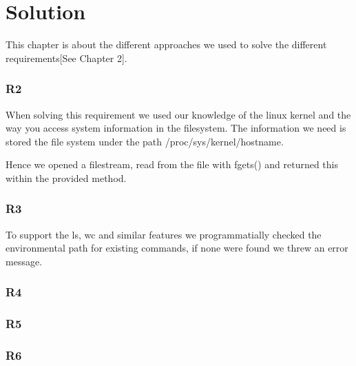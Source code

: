 \chapter{Solution}
This chapter is about the different approaches we used to solve the different requirements[See Chapter 2].

\subsection{R2}
When solving this requirement we used our knowledge of the linux kernel and the way you access system information in the filesystem. The information we need is stored the file system under the path /proc/sys/kernel/hostname.

Hence we opened a filestream, read from the file with fgets() and returned this within the provided method.

\subsection{R3}
To support the ls, wc and similar features we programmatially checked the environmental path for existing commands, if none were found we threw an error message.

\subsection{R4}

\subsection{R5}

\subsection{R6}